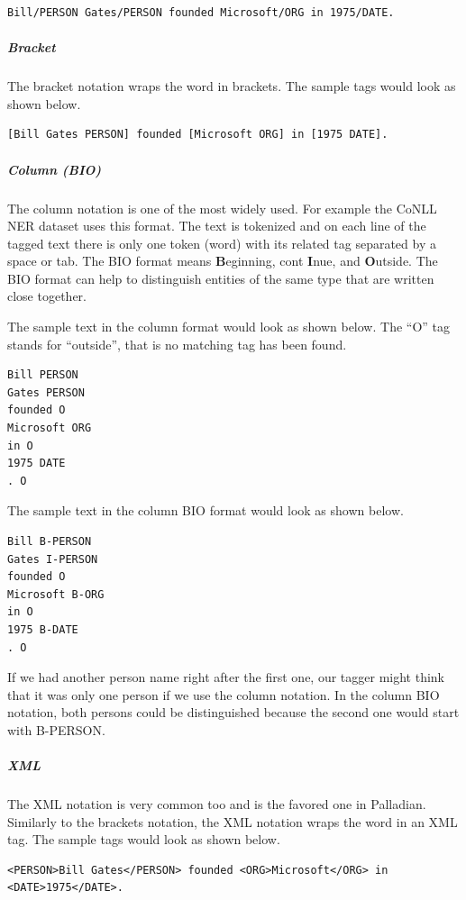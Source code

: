 \begin{verbatim}
Bill/PERSON Gates/PERSON founded Microsoft/ORG in 1975/DATE.
\end{verbatim}

\subparagraph{Bracket} The bracket notation wraps the word in brackets. The sample tags would look as shown below.

\begin{verbatim}
[Bill Gates PERSON] founded [Microsoft ORG] in [1975 DATE].
\end{verbatim}

\subparagraph{Column (BIO)} The column notation is one of the most widely used. For example the CoNLL NER dataset uses this format. The text is tokenized and on each line of the tagged text there is only one token (word) with its related tag separated by a space or tab. The BIO format means \textbf{ B}eginning, cont\textbf{ I}nue, and \textbf{ O}utside. The BIO format can help to distinguish entities of the same type that are written close together.

The sample text in the column format would look as shown below. The ``O'' tag stands for ``outside'', that is no matching tag has been found.

\begin{verbatim}
Bill PERSON
Gates PERSON
founded O
Microsoft ORG
in O
1975 DATE
. O
\end{verbatim}

The sample text in the column BIO format would look as shown below.

\begin{verbatim}
Bill B-PERSON
Gates I-PERSON
founded O
Microsoft B-ORG
in O
1975 B-DATE
. O
\end{verbatim}

If we had another person name right after the first one, our tagger might think that it was only one person if we use the column notation. In the column BIO notation, both persons could be distinguished because the second one would start with B-PERSON.

\subparagraph{XML} The XML notation is very common too and is the favored one in Palladian. Similarly to the brackets notation, the XML notation wraps the word in an XML tag. The sample tags would look as shown below.

\begin{verbatim}
<PERSON>Bill Gates</PERSON> founded <ORG>Microsoft</ORG> in <DATE>1975</DATE>.
\end{verbatim}

